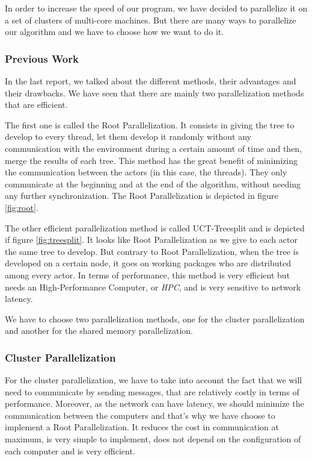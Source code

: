 In order to increase the speed of our program, we have decided to parallelize it on a set of clusters of multi-core machines. But there are many ways to parallelize our algorithm and we have to choose how we want to do it. 
\subsubsection{Previous Work}
In the last report, we talked about the different methods, their advantages and their drawbacks. We have seen that there are mainly two parallelization methods that are efficient.
\smallskip

The first one is called the Root Parallelization. It consists in giving the tree to develop to every thread, let them develop it randomly without any communication with the environment
during a certain amount of time and then, merge the results of each tree.
This method has the great benefit of minimizing the communication between the actors (in this case, the threads).
They only communicate at the beginning and at the end of the algorithm, without needing any further synchronization. The Root Parallelization is depicted in figure \ref{fig:root}.
\smallskip


The other efficient parallelization method is called UCT-Treesplit and is depicted if figure \ref{fig:treesplit}. It looks like Root Parallelization as we give to each actor the same tree to develop.
But contrary to Root Parallelization, when the tree is developed on a certain node, it goes on working packages who are distributed among every actor. %
In terms of performance, this method is very efficient but needs an High-Performance Computer, or \emph{HPC}, and is very sensitive to network latency.
\smallskip



We have to choose two parallelization methods, one for the cluster parallelization and another for the shared memory parallelization.
\subsubsection{Cluster Parallelization}
For the cluster parallelization, we have to take into account the fact that we will need to communicate by sending messages, that are relatively costly in terms of performance.
Moreover, as the network can have latency, we should minimize the communication between the computers and that's why we have choose to implement a Root Parallelization.
It reduces the cost in communication at maximum, is very simple to implement, does not depend on the configuration of each computer and is very efficient.
